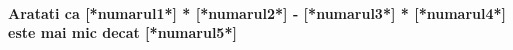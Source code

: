 \documentclass{exam}
\begin{document}
\paragraph{
Aratati ca [*numarul1*] * [*numarul2*] - [*numarul3*] * [*numarul4*] este mai mic decat [*numarul5*]
}
\end{document}
